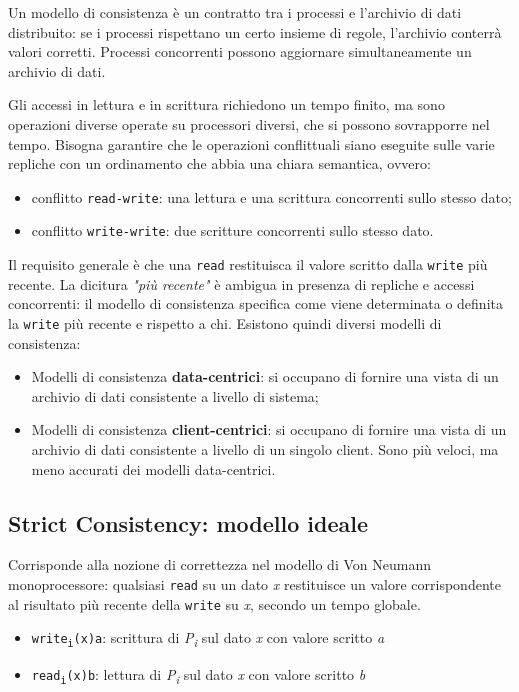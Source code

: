 Un modello di consistenza è un contratto tra i processi e l'archivio di dati distribuito: se i processi rispettano un certo insieme di regole, l'archivio conterrà valori corretti. Processi concorrenti possono aggiornare simultaneamente un archivio di dati.

Gli accessi in lettura e in scrittura richiedono un tempo finito, ma sono operazioni diverse operate su processori diversi, che si possono sovrapporre nel tempo. Bisogna garantire che le operazioni conflittuali siano eseguite sulle varie repliche con un ordinamento che abbia una chiara semantica, ovvero:
\begin{itemize}
    \item conflitto \texttt{read-write}: una lettura e una scrittura concorrenti sullo stesso dato;
    \item conflitto \texttt{write-write}: due scritture concorrenti sullo stesso dato.
\end{itemize}
Il requisito generale è che una \texttt{read} restituisca il valore scritto dalla \texttt{write} più recente. La dicitura \textit{"più recente"} è ambigua in presenza di repliche e accessi concorrenti: il modello di consistenza specifica come viene determinata o definita la \texttt{write} più recente e rispetto a chi. Esistono quindi diversi modelli di consistenza:
\begin{itemize}
    \item Modelli di consistenza \textbf{data-centrici}: si occupano di fornire una vista di un archivio di dati consistente a livello di sistema;
    \item Modelli di consistenza \textbf{client-centrici}: si occupano di fornire una vista di un archivio di dati consistente a livello di un singolo client. Sono più veloci, ma meno accurati dei modelli data-centrici.
\end{itemize}

\subsection{Strict Consistency: modello ideale}
Corrisponde alla nozione di correttezza nel modello di Von Neumann monoprocessore: qualsiasi \texttt{read} su un dato \textit{x} restituisce un valore corrispondente al risultato più recente della \texttt{write} su \textit{x}, secondo un tempo globale.
\begin{itemize}
    \item \texttt{write\textsubscript{i}(x)a}: scrittura di \textit{P\textsubscript{i}} sul dato \textit{x} con valore scritto \textit{a}
    \item \texttt{read\textsubscript{i}(x)b}: lettura di \textit{P\textsubscript{i}} sul dato \textit{x} con valore scritto \textit{b}
\end{itemize}

